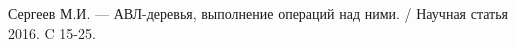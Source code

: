 \begin{thebibliography}{}
	 Сергеев М.И. --- АВЛ-деревья, выполнение операций над ними. / Научная статья 2016. C 15-25. 
\end{thebibliography}
